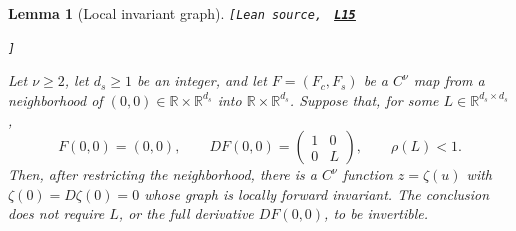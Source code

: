\documentclass[11pt]{article}
\newtheorem{lemma}[theorem]{Lemma}
\newcommand{\R}{\mathbb R}
\newcommand{\leanLinkText}[1]{%
  \underline{\textbf{#1}}%
}
\newcommand{\leanSnapshot}{e308927f5b7930bdd002f0c0e42b9d112ad821cb}
\newcommand{\leanDeclTag}[2]{%
  {\footnotesize\texttt{[Lean source, }}%
  \href{https://github.com/imathwy/DFP_wolfe_local/blob/\leanSnapshot/#1?plain=1\#L#2}%
    {\leanLinkText{\footnotesize\texttt{L#2}}}%
}
\newcommand{\leanDeclTagEnd}{%
  \unskip
  {\footnotesize\texttt{]}}\enspace
}
\begin{document}
\begin{lemma}[Local invariant graph]\label{lem:graph-transform}
\leanDeclTag{DFPWolfe/A_uniformly_convex_counterexample_to_global_convergence_of_DFP_under_weak_Wolfe_/Lemma_Local_invariant_graph_for_a_map.lean}{15}
\leanDeclTagEnd
Let $\nu\ge2$, let $d_s\ge1$ be an integer, and let $F=(F_c,F_s)$ be a
$C^\nu$ map from a neighborhood of $(0,0)\in\R\times\R^{d_s}$ into
$\R\times\R^{d_s}$.  Suppose that, for some
$L\in\R^{d_s\times d_s}$,
\[
F(0,0)=(0,0),\qquad
DF(0,0)=\begin{pmatrix}1&0\\0&L\end{pmatrix},
\qquad \rho(L)<1.
\]
Then, after restricting the neighborhood, there is a $C^\nu$ function
$z=\zeta(u)$ with $\zeta(0)=D\zeta(0)=0$ whose graph is locally forward
invariant.  The conclusion does not require $L$, or the full derivative
$DF(0,0)$, to be invertible.
\end{lemma}
\end{document}
